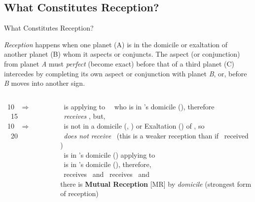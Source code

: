 \subsection{What Constitutes Reception?}
\begin{frame}[t]{What Constitutes Reception?}
\small
\begin{block}{}
\textsl{Reception} happens when one planet (A) is in the domicile or exaltation of another planet (B) whom it aspects or conjuncts. The aspect (or conjunction) from planet \textsl{A} must \textsl{perfect} (become exact)  before that of a third planet (C) intercedes by completing its own aspect or conjunction with planet \textsl{B}, or, before \textsl{B} moves into another sign.
\end{block}

\vspace{0.1cm}
\begin{columns}[T, onlytextwidth]
\Mars\ 10 \Aries\ $\Rightarrow$ \Conjunction\ \Saturn\ 15 \Aries \\
\vspace{1.5cm}
\Mars\ 10 \Capricorn\ $\Rightarrow$ \Square\ \Saturn\ 20 \Aries

\rule{.1mm}{.4\textheight}

\Mars\ is applying to \Conjunction\ \Saturn\ who is in \Mars's domicile (\Aries), therefore\\
\Mars\ \textsl{receives} \Saturn, but, \\
\Mars\ is not in a domicile (\Capricorn, \Aquarius) or Exaltation (\Libra) of \Saturn, so \\
\Saturn\ \textsl{does not receive} \Mars\ (this is a weaker reception than if \Saturn\ received \Mars) \\
\vspace{0.1cm}
\ul
\Mars\ is in \Saturn's domicile (\Capricorn) applying to \Square\ \Saturn \\
\Saturn\ is in \Mars's domicile (\Aries), therefore, \\
\Mars\ receives \Saturn\ and \Saturn\ receives \Mars\ and \\
there is \textbf{Mutual Reception} [MR] by \textsl{domicile} (strongest form of reception)
\end{columns}
\vspace{0.2cm}
\end{frame}
